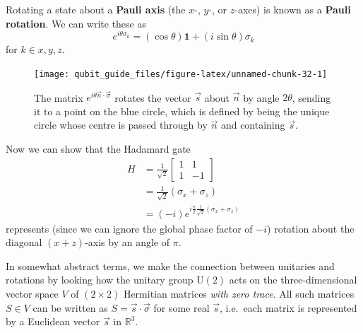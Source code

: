 \documentclass[fleqn,a4paper]{article}
\newenvironment{idea}{\everypar{\setlength{\parindent}{1.5em}}}{}
\theoremstyle{definition}
\theoremstyle{definition}
\theoremstyle{definition}
\theoremstyle{definition}
\theoremstyle{remark}
\begin{document}
\begin{idea}
Rotating a state about a \textbf{Pauli axis} (the \(x\)-, \(y\)-, or \(z\)-axes) is known as a \textbf{Pauli rotation}.
We can write these as
\[
  e^{i\theta\sigma_k}
  = (\cos\theta)\mathbf{1}+ (i\sin\theta)\sigma_k
\]
for \(k\in{x,y,z}\).

\end{idea}



\begin{figure}[H]

{\centering \texttt{[image: qubit\_guide\_files/figure-latex/unnamed-chunk-32-1]} 

}

\caption{The matrix \(e^{i\theta\vec{n}\cdot\vec{\sigma}}\) rotates the vector \(\vec{s}\) about \(\vec{n}\) by angle \(2\theta\), sending it to a point on the blue circle, which is defined by being the unique circle whose centre is passed through by \(\vec{n}\) and containing \(\vec{s}\).}\label{fig:unnamed-chunk-32}
\end{figure}

Now we can show that the Hadamard gate
\[
  \begin{aligned}
    H
    &= \frac{1}{\sqrt{2}}
    \begin{bmatrix}
      1& 1
    \\1 & -1
    \end{bmatrix}
  \\&= \frac{1}{\sqrt{2}}(\sigma_x + \sigma_z)
  \\&= (-i)e^{i \frac{\pi}{2} \frac{1}{\sqrt{2}}(\sigma_x+\sigma_z)}
  \end{aligned}
\]
represents (since we can ignore the global phase factor of \(-i\)) rotation about the diagonal \((x+z)\)-axis by an angle of \(\pi\).

In somewhat abstract terms, we make the connection between unitaries and rotations by looking how the unitary group \(\mathrm{U}(2)\) acts on the three-dimensional vector space \(V\) of \((2\times 2)\) Hermitian matrices \emph{with zero trace}.
All such matrices \(S\in V\) can be written as \(S=\vec{s}\cdot\vec{\sigma}\) for some real \(\vec{s}\), i.e.~each matrix is represented by a Euclidean vector \(\vec{s}\) in \(\mathbb{R}^3\).
\end{document}
